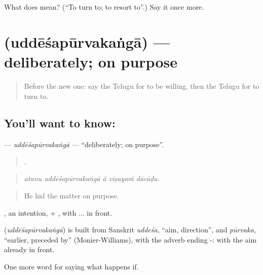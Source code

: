 \begin{tcolorbox}[breakable,colback=teal!4,colframe=teal!35!black,title={Before you move on}]
What does  mean? (\textquotedblleft{}To turn to; to resort to\textquotedblright{}.) Say it once more.
\end{tcolorbox}
\section[\texorpdfstring{\te{ఉద్దేశపూర్వకంగా} (uddēśapūrvakaṅgā)}{ఉద్దేశపూర్వకంగా (uddēśapūrvakaṅgā)}]{ (uddēśapūrvakaṅgā) — deliberately; on purpose}

\label{lesson:TE-C426-uddesapurvakanga}



\begin{quote}
Before the new one: say the Telugu for to be willing, then the Telugu for to turn to.
\end{quote}

\subsection*{You'll want to know: }
\textbf{} — \emph{uddēśapūrvakaṅgā} — \textquotedblleft{}deliberately; on purpose\textquotedblright{}.

\begin{quote}
    .
\end{quote}

\begin{quote}
\emph{atanu uddēśapūrvakaṅgā ā viṣayaṁ dācāḍu.}
\end{quote}

\begin{quote}
He hid the matter on purpose.
\end{quote}

, an intention, + , with ... in front.

\begin{cousinweb}
\textbf{} (\emph{uddēśapūrvakaṅgā}) is built from Sanskrit \emph{uddeśa}, \textquotedblleft{}aim, direction\textquotedblright{}, and \emph{pūrvaka}, \textquotedblleft{}earlier, preceded by\textquotedblright{} (Monier-Williams), with the adverb ending -: with the aim already in front.
\end{cousinweb}

\begin{grammarlens}[title={What you've built}]
One more word for saying what happens if.
\end{grammarlens}

